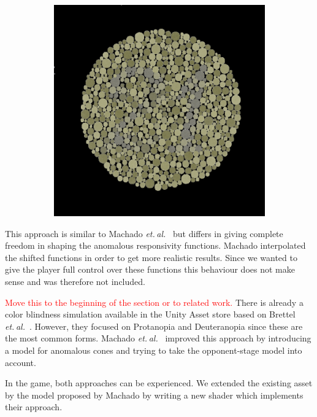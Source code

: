 \documentclass{sig-alternate-05-2015}
\newcommand{\todo}[1]{\textcolor{Red}{#1}}
\newcommand{\etal}{\textit{et. al.}}
\begin{document}
\begin{figure}
\begin{subfigure}[t]{0.5\columnwidth}
    \end{subfigure}
    \begin{subfigure}[t]{0.5\columnwidth}
        \includegraphics[width=\textwidth]{74_deuteranope_zero.png}
    \end{subfigure}
\end{figure}

This approach is similar to Machado \etal~\cite{Machado2009} but differs in giving complete freedom in shaping the anomalous responsivity functions.
Machado interpolated the shifted functions in order to get more realistic results.
Since we wanted to give the player full control over these functions this behaviour does not make sense and was therefore not included.

\todo{Move this to the beginning of the section or to related work.}
There is already a color blindness simulation available in the Unity Asset store based on Brettel \etal~\cite{brettel}.
However, they focused on Protanopia and Deuteranopia since these are the most common forms.
Machado \etal~\cite{Machado2009} improved this approach by introducing a model for anomalous cones and trying to take the opponent-stage model into account.

In the game, both approaches can be experienced.
We extended the existing asset by the model proposed by Machado by writing a new shader which implements their approach.
\end{document}
